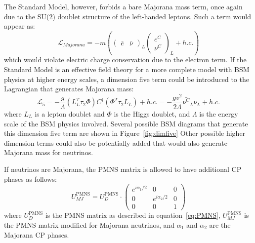 \documentclass[/main.tex]{subfiles}
\begin{document}
The Standard Model, however, forbids a bare Majorana mass term, once again due to the SU(2) doublet structure of the left-handed leptons.
Such a term would appear as:
\begin{equation}
  \mathcal{L}_{Majorana}=-m(\begin{pmatrix}\bar e & \bar\nu\end{pmatrix}_L\begin{pmatrix}e^C \\ \nu^C\end{pmatrix}_L + h.c.)
\end{equation}
which would violate electric charge conservation due to the electron term.
If the Standard Model is an effective field theory for a more complete model with BSM physics at higher energy scales, a dimension five term could be introduced to the Lagrangian that generates Majorana mass:
\begin{equation} \label{eq:dimfive}
  \mathcal{L}_5= -\frac{g}{\Lambda}(L^T_L\tau_2\Phi)C^\dagger(\Phi^T\tau_2L_L) + h.c. = -\frac{gv^2}{2\Lambda}\bar{\nu^C}_L\nu_L + h.c.
\end{equation}
where $L_L$ is a lepton doublet and $\Phi$ is the Higgs doublet, and $\Lambda$ is the energy scale of the BSM physics involved.
Several possible BSM diagrams that generate this dimension five term are shown in Figure~\ref{fig:dimfive}
Other possible higher dimension terms could also be potentially added that would also generate Majorana mass for neutrinos.

If neutrinos are Majorana, the PMNS matrix is allowed to have additional CP phases as follows:
\begin{equation}
  U^{\mathrm{PMNS}}_{MJ}=U^{\mathrm{PMNS}}_D\cdot\begin{pmatrix}
    e^{i\alpha_1/2} & 0 & 0 \\
    0 & e^{i\alpha_2/2} & 0 \\
    0 & 0 & 1
  \end{pmatrix}
\end{equation}
where $U^{\mathrm{PMNS}}_D$ is the PMNS matrix as described in equation~\ref{eq:PMNS}, $U^{\mathrm{PMNS}}_{MJ}$ is the PMNS matrix modified for Majorana neutrinos, and $\alpha_1$ and $\alpha_2$ are the Majorana CP phases.
\end{document}
